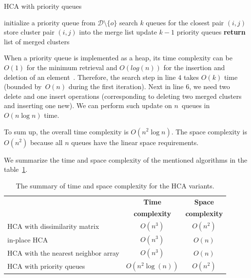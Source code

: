 \begin{algorithm}[t]
 	\caption{HCA with priority queues}
 	\label{alg01:queue}
 	\begin{algorithmic}[1]
 		\State initialize a priority queue from $\mathcal{D} \setminus \{o\}$
 		\EndFor
 		\State search $k$ queues for the closest pair $(i,j)$ 
 		\State store cluster pair $(i,j)$ into the merge list 
 		\State update $k-1$ priority queues 
 		\EndFor
 		\State \textbf{return} list of merged clusters
 		\EndProcedure
 	\end{algorithmic}
\end{algorithm}

When a priority queue is implemented as a heap, its time complexity can be $O(1)$ for the minimum retrieval and $O(log(n))$ for the insertion and deletion of an element~\cite{fredman1987fibonacci}.
Therefore, the search step in line $4$ takes $O(k)$ time (bounded by~$O(n)$ during the first iteration). Next in line $6$, we need two delete and one insert operations (corresponding to deleting two merged clusters and inserting one new). We can perform such update on $n$~queues in $O(n\log{n})$ time.

To sum up, the overall time complexity is $O(n^2\log{n})$. The space complexity is $O(n^2)$ because all $n$ queues have the linear space requirements.

\vspace{0.5cm}

We summarize the time and space complexity of the mentioned algorithms in the table~\ref{tab01:hca}.

\begin{table}[t]
	\centering
	\begin{tabular}{lcc}
		\toprule
		 & \textbf{Time} & \textbf{Space} \\
		 \pulrad{\textbf{HCA variant}} & \textbf{complexity} & \textbf{complexity} \\
		\midrule
		HCA with dissimilarity matrix & $O(n^3)$ & $O(n^2)$ \\
		in-place HCA & $O(n^3)$ & $O(n)$ \\
		HCA with the nearest neighbor array & $O(n^3)$ & $O(n)$ \\
		HCA with priority queues & $O(n^2\log(n))$ & $O(n^2)$ \\
		\bottomrule
	\end{tabular}
	\caption{The summary of time and space complexity for the HCA variants.}
	\label{tab01:hca}
\end{table}

